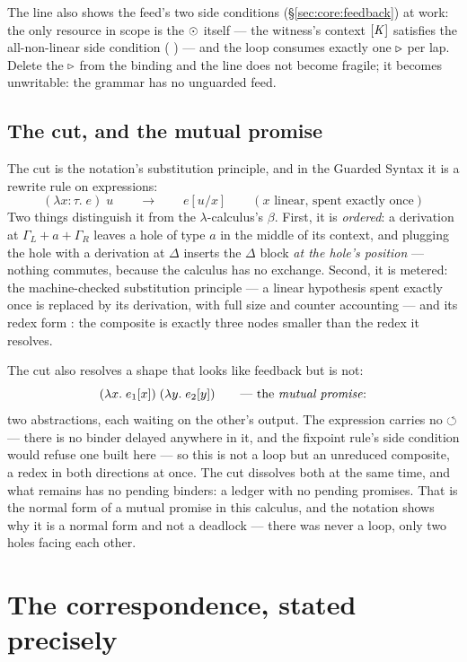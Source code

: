 \documentclass{eptcs}
\begin{document}
The line also shows the feed's two side conditions
(\S\ref{sec:core:feedback}) at work: the only resource in scope is the
$\odot$ itself --- the witness's context $[\mathit{K}]$ satisfies the
all-non-linear side condition (
) --- and the loop consumes exactly one $\triangleright$
per lap. Delete the $\triangleright$ from the binding and the line does not
become fragile; it becomes unwritable: the grammar has no unguarded
feed.

\subsection{The cut, and the mutual promise}\label{sec:worked:cut}

The cut is the notation's substitution principle, and in the Guarded
Syntax it is a rewrite rule on expressions:
\[
(\lambda x{:}\tau.\;e)\;u \qquad \longrightarrow \qquad e[u/x]
\qquad (x \text{ linear, spent exactly once})
\]
Two things distinguish it from the $\lambda$-calculus's $\beta$. First,
it is \emph{ordered}: a derivation at $\Gamma_L + a + \Gamma_R$ leaves a
hole of type $a$ in the middle of its context, and plugging the hole
with a derivation at $\Delta$ inserts the $\Delta$ block \emph{at the
hole's position} --- nothing commutes, because the calculus has no
exchange. Second, it is metered: the machine-checked substitution
principle   --- a linear
hypothesis spent exactly once is replaced by its derivation, with full
size and counter accounting --- and its redex form
 : the composite is
exactly three nodes smaller than the redex it resolves.

The cut also resolves a shape that looks like feedback but is not:
\[
(\lambda x.\;e_1[x])\;(\lambda y.\;e_2[y])
\qquad\text{--- the \emph{mutual promise}:}
\]
two abstractions, each waiting on the other's output. The expression
carries no $\circlearrowleft$ --- there is no binder delayed anywhere in it, and
the fixpoint rule's side condition would refuse one built here --- so
this is not a loop but an unreduced composite, a redex in both
directions at once. The cut dissolves both at the same time, and what
remains has no pending binders: a ledger with no pending promises. That
is the normal form of a mutual promise in this calculus, and the
notation shows why it is a normal form and not a deadlock --- there was
never a loop, only two holes facing each other.

\section{The correspondence, stated precisely}\label{sec:correspondence}
\end{document}
